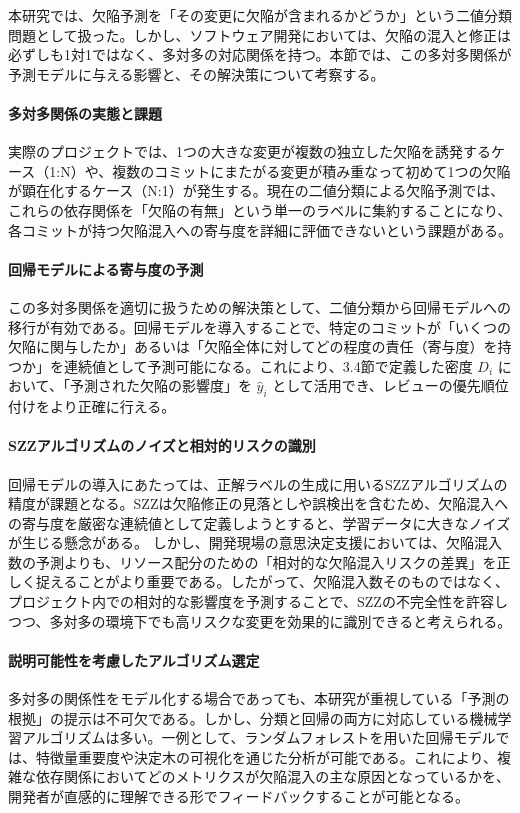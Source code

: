 本研究では、欠陥予測を「その変更に欠陥が含まれるかどうか」という二値分類問題として扱った。しかし、ソフトウェア開発においては、欠陥の混入と修正は必ずしも1対1ではなく、多対多の対応関係を持つ。本節では、この多対多関係が予測モデルに与える影響と、その解決策について考察する。

\paragraph{多対多関係の実態と課題}
実際のプロジェクトでは、1つの大きな変更が複数の独立した欠陥を誘発するケース（1:N）や、複数のコミットにまたがる変更が積み重なって初めて1つの欠陥が顕在化するケース（N:1）が発生する。現在の二値分類による欠陥予測では、これらの依存関係を「欠陥の有無」という単一のラベルに集約することになり、各コミットが持つ欠陥混入への寄与度を詳細に評価できないという課題がある。

\paragraph{回帰モデルによる寄与度の予測}
この多対多関係を適切に扱うための解決策として、二値分類から回帰モデルへの移行が有効である。回帰モデルを導入することで、特定のコミットが「いくつの欠陥に関与したか」あるいは「欠陥全体に対してどの程度の責任（寄与度）を持つか」を連続値として予測可能になる。これにより、3.4節で定義した密度 $D_{i}$ において、「予測された欠陥の影響度」を $\hat{y}_{i}$ として活用でき、レビューの優先順位付けをより正確に行える。

\paragraph{SZZアルゴリズムのノイズと相対的リスクの識別}
回帰モデルの導入にあたっては、正解ラベルの生成に用いるSZZアルゴリズムの精度が課題となる。SZZは欠陥修正の見落としや誤検出を含むため、欠陥混入への寄与度を厳密な連続値として定義しようとすると、学習データに大きなノイズが生じる懸念がある。
しかし、開発現場の意思決定支援においては、欠陥混入数の予測よりも、リソース配分のための「相対的な欠陥混入リスクの差異」を正しく捉えることがより重要である。したがって、欠陥混入数そのものではなく、プロジェクト内での相対的な影響度を予測することで、SZZの不完全性を許容しつつ、多対多の環境下でも高リスクな変更を効果的に識別できると考えられる。

\paragraph{説明可能性を考慮したアルゴリズム選定}
多対多の関係性をモデル化する場合であっても、本研究が重視している「予測の根拠」の提示は不可欠である。しかし、分類と回帰の両方に対応している機械学習アルゴリズムは多い。一例として、ランダムフォレストを用いた回帰モデルでは、特徴量重要度や決定木の可視化を通じた分析が可能である。これにより、複雑な依存関係においてどのメトリクスが欠陥混入の主な原因となっているかを、開発者が直感的に理解できる形でフィードバックすることが可能となる。
